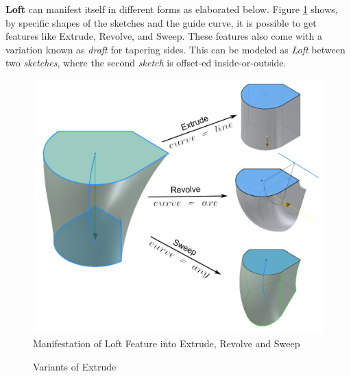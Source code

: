 {\bf Loft} can manifest itself in different forms as elaborated below. Figure \ref{fig:abstraction:extruderevolvesweepasloft} shows, by specific shapes of the sketches and the guide curve, it is possible to get features like Extrude, Revolve, and Sweep. These features also come with a variation known as {\em draft}  for tapering sides. This can be modeled as {\em Loft} between two {\em sketches}, where the second {\em sketch} is offset-ed inside-or-outside.


\begin{figure}[htbp]
\centering
	\includegraphics[scale=0.55]{images//LoftExtrudeRevSwp.pdf} 
\caption{Manifestation of Loft Feature into Extrude, Revolve and Sweep}
\label{fig:abstraction:extruderevolvesweepasloft}
\end{figure}


\begin{figure}[!h]
\centering 
{}\quad
{}

\caption{Variants of Extrude}
\label{fig_extrvar}
\end{figure}

